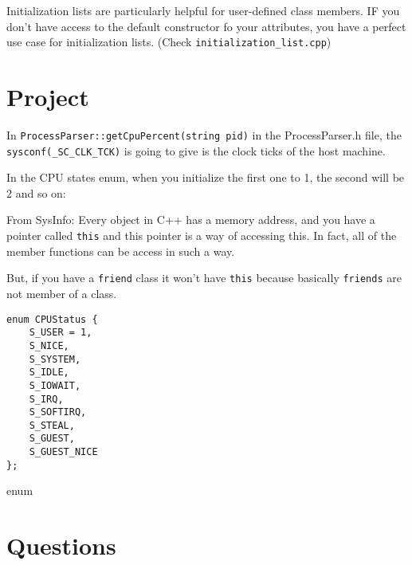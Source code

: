 \documentclass[11pt, a4paper]{article}
\begin{document}
Initialization lists are particularly helpful for user-defined class members. IF you don't have access to the default constructor fo your attributes, you have a perfect use case for initialization lists. (Check \texttt{initialization\_list.cpp})


\section{Project}%
\label{sec:project}

In \texttt{ProcessParser::getCpuPercent(string pid)} in the ProcessParser.h file, the \texttt{sysconf(\_SC\_CLK\_TCK)} is going to give is the clock ticks of the host machine.   



In the CPU states enum, when you initialize the first one to 1, the second will be 2 and so on:



From SysInfo: Every object in C++ has a memory address, and you have a pointer called \texttt{this} and this pointer is a way of accessing this. In fact, all of the member functions can be access in such a way. 

But, if you have a \texttt{friend} class it won't have \texttt{this} because basically \texttt{friends} are not member of a class.



\begin{listing}
\begin{verbatim}
enum CPUStatus {
	S_USER = 1,
	S_NICE,
	S_SYSTEM,
	S_IDLE,
	S_IOWAIT,
	S_IRQ,
	S_SOFTIRQ,
	S_STEAL,
	S_GUEST,
	S_GUEST_NICE
};
\end{verbatim}
\caption{enum}
\label{lst:enum}
\end{listing}
































\section{Questions}%
\label{sec:questions}
\end{document}
